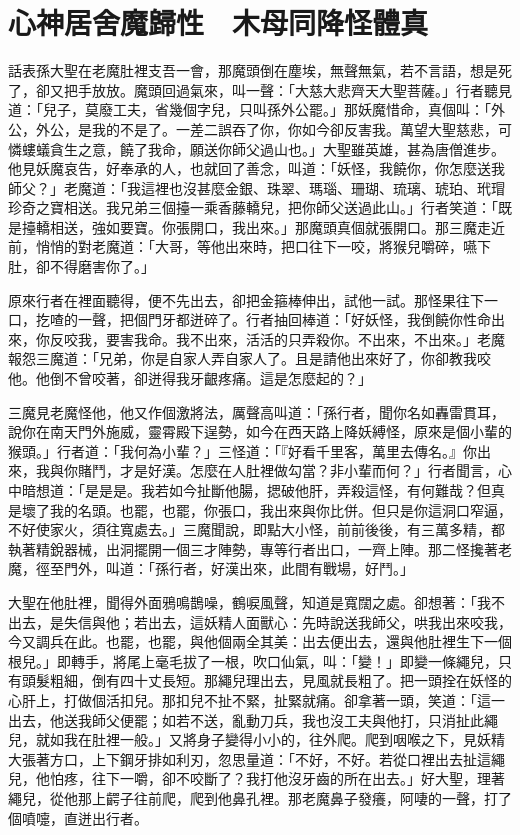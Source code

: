 
\chapter{心神居舍魔歸性　木母同降怪體真}

話表孫大聖在老魔肚裡支吾一會，那魔頭倒在塵埃，無聲無氣，若不言語，想是死了，卻又把手放放。魔頭回過氣來，叫一聲：「大慈大悲齊天大聖菩薩。」行者聽見道：「兒子，莫廢工夫，省幾個字兒，只叫孫外公罷。」那妖魔惜命，真個叫：「外公，外公，是我的不是了。一差二誤吞了你，你如今卻反害我。萬望大聖慈悲，可憐螻蟻貪生之意，饒了我命，願送你師父過山也。」大聖雖英雄，甚為唐僧進步。他見妖魔哀告，好奉承的人，也就回了善念，叫道：「妖怪，我饒你，你怎麼送我師父？」老魔道：「我這裡也沒甚麼金銀、珠翠、瑪瑙、珊瑚、琉璃、琥珀、玳瑁珍奇之寶相送。我兄弟三個擡一乘香藤轎兒，把你師父送過此山。」行者笑道：「既是擡轎相送，強如要寶。你張開口，我出來。」那魔頭真個就張開口。那三魔走近前，悄悄的對老魔道：「大哥，等他出來時，把口往下一咬，將猴兒嚼碎，嚥下肚，卻不得磨害你了。」

原來行者在裡面聽得，便不先出去，卻把金箍棒伸出，試他一試。那怪果往下一口，扢喳的一聲，把個門牙都迸碎了。行者抽回棒道：「好妖怪，我倒饒你性命出來，你反咬我，要害我命。我不出來，活活的只弄殺你。不出來，不出來。」老魔報怨三魔道：「兄弟，你是自家人弄自家人了。且是請他出來好了，你卻教我咬他。他倒不曾咬著，卻迸得我牙齦疼痛。這是怎麼起的？」

三魔見老魔怪他，他又作個激將法，厲聲高叫道：「孫行者，聞你名如轟雷貫耳，說你在南天門外施威，靈霄殿下逞勢，如今在西天路上降妖縛怪，原來是個小輩的猴頭。」行者道：「我何為小輩？」三怪道：「『好看千里客，萬里去傳名。』你出來，我與你賭鬥，才是好漢。怎麼在人肚裡做勾當？非小輩而何？」行者聞言，心中暗想道：「是是是。我若如今扯斷他腸，揌破他肝，弄殺這怪，有何難哉？但真是壞了我的名頭。也罷，也罷，你張口，我出來與你比併。但只是你這洞口窄逼，不好使家火，須往寬處去。」三魔聞說，即點大小怪，前前後後，有三萬多精，都執著精銳器械，出洞擺開一個三才陣勢，專等行者出口，一齊上陣。那二怪攙著老魔，徑至門外，叫道：「孫行者，好漢出來，此間有戰場，好鬥。」

大聖在他肚裡，聞得外面鴉鳴鵲噪，鶴唳風聲，知道是寬闊之處。卻想著：「我不出去，是失信與他；若出去，這妖精人面獸心：先時說送我師父，哄我出來咬我，今又調兵在此。也罷，也罷，與他個兩全其美：出去便出去，還與他肚裡生下一個根兒。」即轉手，將尾上毫毛拔了一根，吹口仙氣，叫：「變！」即變一條繩兒，只有頭髮粗細，倒有四十丈長短。那繩兒理出去，見風就長粗了。把一頭拴在妖怪的心肝上，打做個活扣兒。那扣兒不扯不緊，扯緊就痛。卻拿著一頭，笑道：「這一出去，他送我師父便罷；如若不送，亂動刀兵，我也沒工夫與他打，只消扯此繩兒，就如我在肚裡一般。」又將身子變得小小的，往外爬。爬到咽喉之下，見妖精大張著方口，上下鋼牙排如利刃，忽思量道：「不好，不好。若從口裡出去扯這繩兒，他怕疼，往下一嚼，卻不咬斷了？我打他沒牙齒的所在出去。」好大聖，理著繩兒，從他那上齶子往前爬，爬到他鼻孔裡。那老魔鼻子發癢，阿啛的一聲，打了個噴嚏，直迸出行者。


